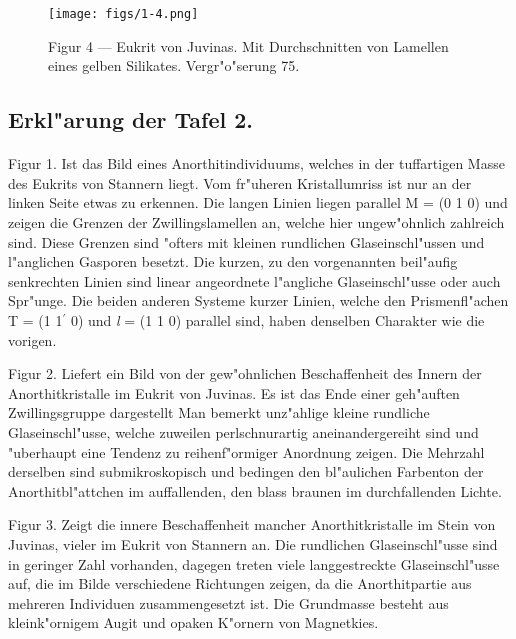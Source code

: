\documentclass[a4paper, 11pt, oneside, polutonikogreek, german]{article}
\begin{document}
\vspace*{\fill}
\begin{figure}[H]
\centering
\texttt{[image: figs/1-4.png]}
\caption{\small Figur 4 --- Eukrit von Juvinas. Mit Durchschnitten von Lamellen eines gelben Silikates. Vergr"o"serung 75.}
\end{figure}
\vspace*{\fill}
\clearpage
{}
\subsection{Erkl"arung der Tafel 2.}
\paragraph{}
Figur 1. Ist das Bild eines Anorthitindividuums, welches in der tuffartigen Masse des Eukrits von Stannern liegt. Vom fr"uheren Kristallumriss ist nur an der linken Seite etwas zu erkennen. Die langen Linien liegen parallel M = (0 1 0) und zeigen die Grenzen der Zwillingslamellen an, welche hier ungew"ohnlich zahlreich sind. Diese Grenzen sind "ofters mit kleinen rundlichen Glaseinschl"ussen und l"anglichen Gasporen besetzt. Die kurzen, zu den vorgenannten beil"aufig senkrechten Linien sind linear angeordnete l"angliche Glaseinschl"usse oder auch Spr"unge. Die beiden anderen Systeme kurzer Linien, welche den Prismenfl"achen T = (1 1$^{\prime}$ 0) und \emph{l} = (1 1 0) parallel sind, haben denselben Charakter wie die vorigen.

Figur 2. Liefert ein Bild von der gew"ohnlichen Beschaffenheit des Innern der Anorthitkristalle im Eukrit von Juvinas. Es ist das Ende einer geh"auften Zwillingsgruppe dargestellt Man bemerkt unz"ahlige kleine rundliche Glaseinschl"usse, welche zuweilen perlschnurartig aneinandergereiht sind und "uberhaupt eine Tendenz zu reihenf"ormiger Anordnung zeigen. Die Mehrzahl derselben sind submikroskopisch und bedingen den bl"aulichen Farbenton der Anorthitbl"attchen im auffallenden, den blass braunen im durchfallenden Lichte.

Figur 3. Zeigt die innere Beschaffenheit mancher Anorthitkristalle im Stein von Juvinas, vieler im Eukrit von Stannern an. Die rundlichen Glaseinschl"usse sind in geringer Zahl vorhanden, dagegen treten viele langgestreckte Glaseinschl"usse auf, die im Bilde verschiedene Richtungen zeigen, da die Anorthitpartie aus mehreren Individuen zusammengesetzt ist. Die Grundmasse besteht aus kleink"ornigem Augit und opaken K"ornern von Magnetkies.
\end{document}
